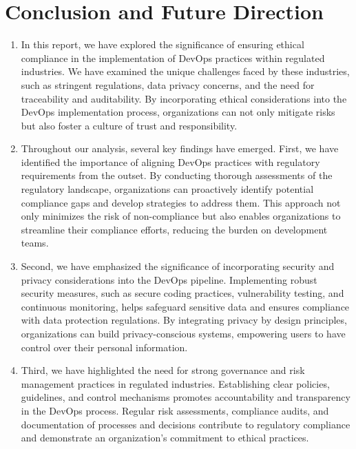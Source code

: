 \chapter{Conclusion and Future Direction}

\begin{enumerate}

    \item In this report, we have explored the significance of ensuring ethical compliance in the implementation of DevOps practices within regulated industries. We have examined the unique challenges faced by these industries, such as stringent regulations, data privacy concerns, and the need for traceability and auditability. By incorporating ethical considerations into the DevOps implementation process, organizations can not only mitigate risks but also foster a culture of trust and responsibility.

    \item Throughout our analysis, several key findings have emerged. First, we have identified the importance of aligning DevOps practices with regulatory requirements from the outset. By conducting thorough assessments of the regulatory landscape, organizations can proactively identify potential compliance gaps and develop strategies to address them. This approach not only minimizes the risk of non-compliance but also enables organizations to streamline their compliance efforts, reducing the burden on development teams.

    \item Second, we have emphasized the significance of incorporating security and privacy considerations into the DevOps pipeline. Implementing robust security measures, such as secure coding practices, vulnerability testing, and continuous monitoring, helps safeguard sensitive data and ensures compliance with data protection regulations. By integrating privacy by design principles, organizations can build privacy-conscious systems, empowering users to have control over their personal information.

    \item Third, we have highlighted the need for strong governance and risk management practices in regulated industries. Establishing clear policies, guidelines, and control mechanisms promotes accountability and transparency in the DevOps process. Regular risk assessments, compliance audits, and documentation of processes and decisions contribute to regulatory compliance and demonstrate an organization's commitment to ethical practices.


\end{enumerate}
